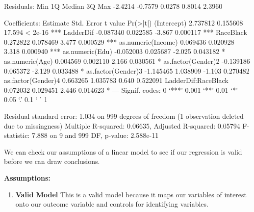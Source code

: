 \documentclass{article}
\begin{document}
\begin{enumerate}
\begin{Schunk}
\begin{Soutput}
Residuals:
    Min      1Q  Median      3Q     Max 
-2.4214 -0.7579  0.0278  0.8014  2.3960 

Coefficients:
                     Estimate Std. Error t value Pr(>|t|)    
(Intercept)          2.737812   0.155608  17.594  < 2e-16 ***
LadderDif           -0.087340   0.022585  -3.867 0.000117 ***
RaceBlack            0.272822   0.078469   3.477 0.000529 ***
as.numeric(Income)   0.069436   0.020928   3.318 0.000940 ***
as.numeric(Edu)     -0.052003   0.025687  -2.025 0.043182 *  
as.numeric(Age)      0.004569   0.002110   2.166 0.030561 *  
as.factor(Gender)2  -0.139186   0.065372  -2.129 0.033488 *  
as.factor(Gender)3  -1.145465   1.038909  -1.103 0.270482    
as.factor(Gender)4   0.663265   1.035783   0.640 0.522091    
LadderDif:RaceBlack  0.072032   0.029451   2.446 0.014623 *  
---
Signif. codes:  0 ‘***’ 0.001 ‘**’ 0.01 ‘*’ 0.05 ‘.’ 0.1 ‘ ’ 1

Residual standard error: 1.034 on 999 degrees of freedom
  (1 observation deleted due to missingness)
Multiple R-squared:  0.06635,	Adjusted R-squared:  0.05794 
F-statistic: 7.888 on 9 and 999 DF,  p-value: 2.588e-11
\end{Soutput}
\end{Schunk}

We can check our assumptions of a linear model to see if our regression is valid before we can draw conclusions. 

\textbf{Assumptions:}
\begin{enumerate}
\item \textbf{Valid Model} This is a valid model because it maps our variables of interest onto our outcome variable and controls for identifying variables. 


\end{enumerate}
\end{enumerate}
\end{document}
